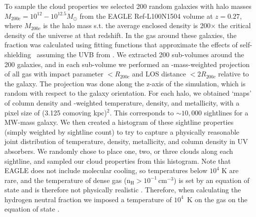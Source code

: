 \documentclass[fleqn,usenatbib]{mnras}
\begin{document}
To sample the cloud properties we selected 200 random galaxies with halo masses $M_{200c} = 10^{12} - 10^{12.5} M_\odot$ from the EAGLE Ref-L100N1504 volume at $z=0.27$, where $M_{200c}$ is the halo mass s.t. the average enclosed density is 200$\times$ the critical density of the universe at that redshift.
In the gas around these galaxies, the  fraction was calculated using fitting functions that approximate the effects of self-shielding~\citep{Rahmati2013} assuming the UVB from \citet{Haardt2001}.
We extracted 200 sub-volumes around the 200 galaxies, and in each sub-volume we performed an -mass-weighted projection of all gas with impact parameter $< R_{200c}$ and LOS distance $< 2 R_{200c}$ relative to the galaxy. The projection was done along the z-axis of the simulation, which is random with respect to the galaxy orientation.
For each halo, we obtained  `maps' of  column density and -weighted temperature, density, and metallicity, with a pixel size of (3.125 comoving kpc)$^2$.
This corresponds to $\sim 10,000$ sightlines for a MW-mass galaxy.
We then created a histogram of these sightline properties (simply weighted by sightline count) to try to capture a physically reasonable joint distribution of temperature, density, metallicity, and  column density in UV absorbers.
We randomly chose to place one, two, or three clouds along each sightline, and sampled our cloud properties from this histogram.
Note that EAGLE does not include molecular cooling, so temperatures below $10^4$ K are rare, and the temperature of dense gas ($\mathrm{n}_{\mathrm{H}} > 10^{-1} \, \mathrm{cm}^{-3}$) is set by an equation of state and is therefore not physically realistic \citep{Schaye2015}.
Therefore, when calculating the hydrogen neutral fraction we imposed a temperature of $10^4$~K on the gas on the equation of state \citep[following e.g.,][]{Rahmati2016}.
\end{document}

